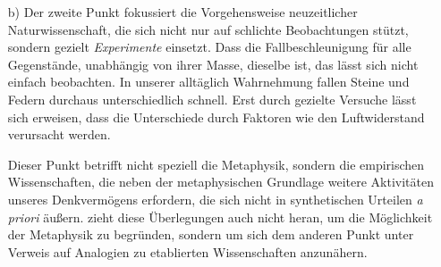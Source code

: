 \begin{nummerierung}
\begin{enumerate}
In dieser Überlegung besteht die Auflösung des genannten Dilemmas in der
Analytik des Verstandes der . Vorstellungen
seien \enquote{in Ansehung des Gegenstandes alsdenn a priori bestimmend, wenn
durch sie allein es möglich ist, etwas .}\footnote{\cite[][\S~14]{Kant:KritikderreinenVernunft2003},
\cite[][III: 104.15--17]{Kant:GesammelteWerke1900ff.}.} Die reinen
Verstandesbegriff sind \enquote{Begriffe von einem Gegenstande überhaupt,
dadurch dessen Anschauung in Ansehung einer der  zu
Urteilen als bestimmt angesehen
wird.}\footnote{\cite[][\S~14]{Kant:KritikderreinenVernunft2003},
\cite[][III: 106.17--19]{Kant:GesammelteWerke1900ff.}.}
\item[b)] Der zweite Punkt fokussiert die Vorgehensweise neuzeitlicher
Naturwissenschaft, die sich nicht nur auf schlichte Beobachtungen stützt,
sondern gezielt \emph{Experimente} einsetzt. Dass die Fallbeschleunigung für alle Gegenstände,
unabhängig von ihrer Masse, dieselbe ist, das lässt sich nicht einfach
beobachten. In unserer alltäglich Wahrnehmung fallen Steine und Federn durchaus
unterschiedlich schnell. Erst durch gezielte Versuche lässt sich erweisen, dass
die Unterschiede durch Faktoren wie den Luftwiderstand verursacht werden.

Dieser Punkt betrifft nicht speziell die Metaphysik, sondern die empirischen
Wissenschaften, die neben der metaphysischen Grundlage weitere Aktivitäten
unseres Denkvermögens erfordern, die sich nicht in synthetischen Urteilen
\emph{a priori} äußern.  zieht diese Überlegungen auch
nicht heran, um die Möglichkeit der Metaphysik zu begründen, sondern um sich dem
anderen Punkt unter Verweis auf Analogien zu etablierten Wissenschaften
anzunähern.
\end{enumerate}


\end{nummerierung}
